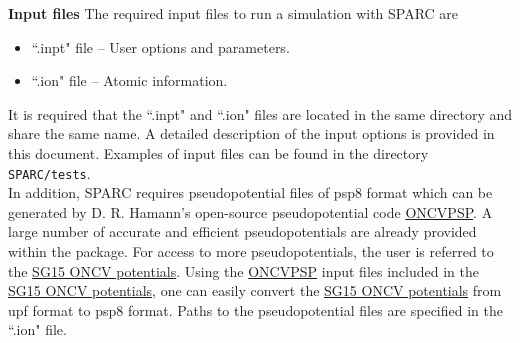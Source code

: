 \begin{frame}[allowframebreaks]{\textbf{Input files}} \label{Inputfiles}
The required input files to run a simulation with SPARC are
\begin{itemize}
  \item ``.inpt" file -- User options and parameters.
  \item ``.ion" file -- Atomic information.
\end{itemize}
It is required that the ``.inpt" and ``.ion" files are located in the same directory and share the same name. A detailed description of the input options is provided in this document. Examples of input files can be found in the directory \texttt{SPARC/tests}. \\
\hspace{3mm}In addition, SPARC requires pseudopotential files of psp8 format which can be generated by D. R. Hamann's open-source pseudopotential code \href{http://www.mat-simresearch.com/}{ONCVPSP}. A large number of accurate and efficient pseudopotentials are already provided within the package. For access to more pseudopotentials, the user is referred to the \href{http://www.quantum-simulation.org/potentials/sg15_oncv/}{SG15 ONCV potentials}. Using the \href{http://www.mat-simresearch.com/}{ONCVPSP} input files included in the \href{http://www.quantum-simulation.org/potentials/sg15_oncv/}{SG15 ONCV potentials}, one can easily convert the \href{http://www.quantum-simulation.org/potentials/sg15_oncv/}{SG15 ONCV potentials} from upf format to psp8 format. Paths to the pseudopotential files are specified in the ``.ion" file.
\end{frame}



